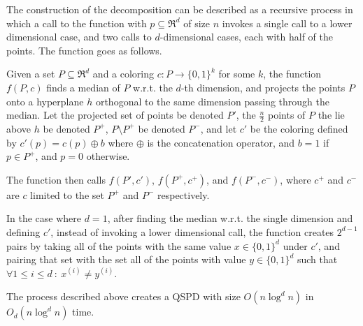 \documentclass[12pt]{article}%
\begin{document}
The construction of the decomposition can be described as a recursive
process in which a call to the function with $p\subseteq \Re^d$ of
size $n$ invokes a single call to a lower dimensional case, and two
calls to $d$-dimensional cases, each with half of the points. The
function goes as follows.

Given a set $P\subseteq \Re^d$ and a coloring
$c:P\longrightarrow \{0,1\}^k$ for some $k$, the function $f(P,c)$
finds a median of $P$ w.r.t. the $d$-th dimension, and projects the
points $P$ onto a hyperplane $h$ orthogonal to the same dimension
passing through the median. Let the projected set of points be denoted
$P'$, the $\frac{n}{2}$ points of $P$ the lie above $h$ be denoted
$P^+$, $P\setminus P^+$ be denoted $P^-$, and let $c'$ be the coloring
defined by $c'(p)=c(p)\oplus b$ where $\oplus$ is the concatenation
operator, and $b=1$ if $p\in P^+$, and $p=0$ otherwise.

The function then calls $f(P', c')$, $f(P^+, c^+)$, and $f(P^-, c^-)$,
where $c^+$ and $c^-$ are $c$ limited to the set $P^+$ and $P^-$
respectively.

In the case where $d=1$, after finding the median w.r.t. the single
dimension and defining $c'$, instead of invoking a lower dimensional
call, the function creates $2^{d-1}$ pairs by taking all of the points
with the same value $x\in\{0,1\}^d$ under $c'$, and pairing that set
with the set all of the points with value $y\in\{0,1\}^d$ such that
$\forall 1\leq i\leq d~:~ x^{(i)}\neq y^{(i)}$.


\begin{claim}
    The process described above creates a QSPD with size $O(n\log^dn)$
    in $O_d(n\log^dn)$ time.
\end{claim}
\end{document}
